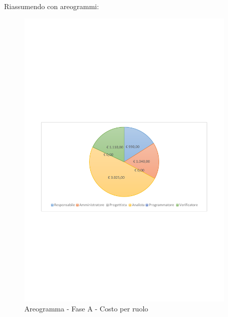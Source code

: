 \documentclass[../PianoProgetto.tex]{subfiles}
\begin{document}
\vfill	
Riassumendo con areogrammi:

	\begin{figure}[!h]
		\centering
		\includegraphics[width=0.93\textwidth , trim=2cm 9.5cm 2cm 11cm]{grafici/A/A-costo}
			\caption{Areogramma - Fase A - Costo per ruolo}
		\label{fig:CircleChart-faseA_costo}
	\end{figure}
\vfill	
\newpage
\vfill	
\end{document}
